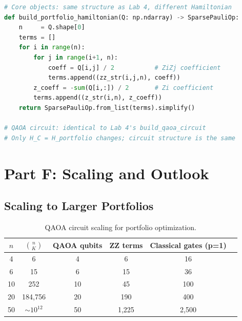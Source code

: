 \documentclass[a4paper,11pt]{article}
\begin{document}
\begin{tcolorbox}[colback=green!5!white,colframe=green!75!black,
    title=Key Code Structure, fonttitle=\bfseries]
\begin{lstlisting}[language=Python]
# Core objects: same structure as Lab 4, different Hamiltonian
def build_portfolio_hamiltonian(Q: np.ndarray) -> SparsePauliOp:
    n     = Q.shape[0]
    terms = []
    for i in range(n):
        for j in range(i+1, n):
            coeff = Q[i,j] / 2           # ZiZj coefficient
            terms.append((zz_str(i,j,n), coeff))
        z_coeff = -sum(Q[i,:]) / 2       # Zi coefficient
        terms.append((z_str(i,n), z_coeff))
    return SparsePauliOp.from_list(terms).simplify()

# QAOA circuit: identical to Lab 4's build_qaoa_circuit
# Only H_C = H_portfolio changes; circuit structure is the same
\end{lstlisting}
\end{tcolorbox}

\section{Part F: Scaling and Outlook}

\subsection{Scaling to Larger Portfolios}

\begin{table}[H]
\centering
\caption{QAOA circuit scaling for portfolio optimization.}
\label{tab:scaling}
\begin{tabular}{cccccc}
    \toprule
    $n$ & $\binom{n}{K}$ & QAOA qubits & ZZ terms & Classical gates (p=1) \\
    \midrule
    4  & 6          & 4   & 6   & 16  \\
    6  & 15         & 6   & 15  & 36  \\
    10 & 252        & 10  & 45  & 100 \\
    20 & 184,756    & 20  & 190 & 400 \\
    50 & $\sim 10^{12}$ & 50  & 1,225 & 2,500 \\
    \bottomrule
\end{tabular}
\end{table}
\end{document}
